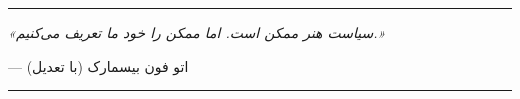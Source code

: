 \vspace{10mm}
\begin{center}
\rule{0.6\textwidth}{1pt}

\vspace{3mm}
\textit{«سیاست هنر ممکن است. اما ممکن را خود ما تعریف می‌کنیم.»}

\vspace{2mm}
--- اتو فون بیسمارک (با تعدیل)

\vspace{3mm}
\rule{0.6\textwidth}{1pt}
\end{center}
